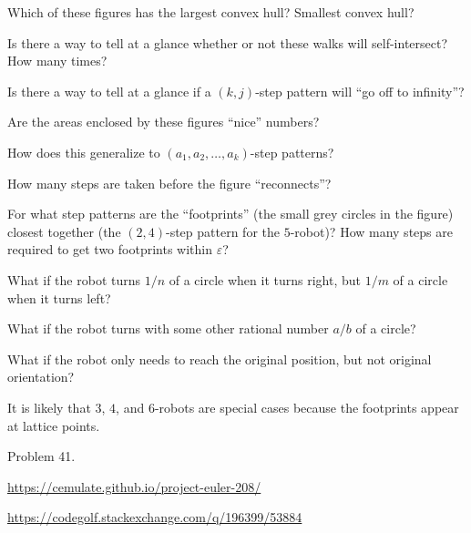 \documentclass{article}
\begin{document}
\begin{related}
  \item Which of these figures has the largest convex hull? Smallest convex hull?
  \item Is there a way to tell at a glance whether or not these walks will
    self-intersect? How many times?
  \item Is there a way to tell at a glance if a $(k,j)$-step pattern will
    ``go off to infinity''?
  \item Are the areas enclosed by these figures ``nice'' numbers?
  \item How does this generalize to $(a_1, a_2, \hdots, a_k)$-step patterns?
  \item How many steps are taken before the figure ``reconnects''?
  \item For what step patterns are the ``footprints'' (the small grey circles
    in the figure) closest together (the $(2, 4)$-step pattern for the
    $5$-robot)?
    How many steps are required to get two footprints within $\varepsilon$?
  \item What if the robot turns $1/n$ of a circle when it turns right, but
    $1/m$ of a circle when it turns left?
  \item What if the robot turns with some other rational number $a/b$ of a
    circle?
  \item What if the robot only needs to reach the original position, but
    not original orientation?
\end{related}
\begin{note}
  It is likely that $3$, $4$, and $6$-robots are special cases because the
  footprints appear at lattice points.
\end{note}
\begin{references}
  \item Problem 41.
  \item \url{https://cemulate.github.io/project-euler-208/}
  \item \url{https://codegolf.stackexchange.com/q/196399/53884}
\end{references}
\end{document}

